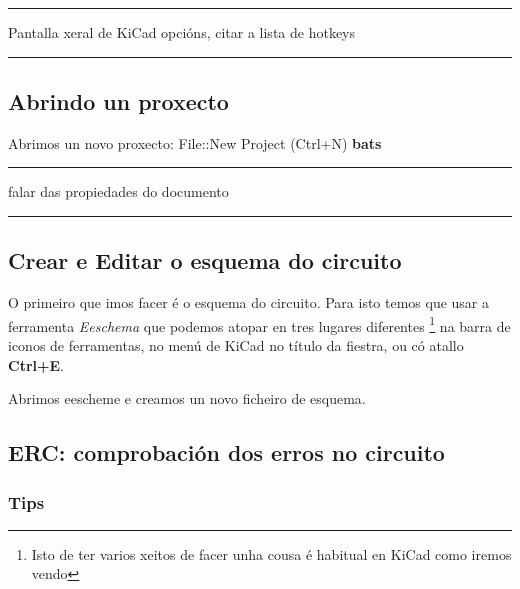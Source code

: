 \begin{center}\rule{0.5\linewidth}{\linethickness}\end{center}

Pantalla xeral de KiCad opcións, citar a lista de hotkeys

\begin{center}\rule{0.5\linewidth}{\linethickness}\end{center}

\subsection{Abrindo un proxecto}\label{abrindo-un-proxecto}

Abrimos un novo proxecto: File::New Project (Ctrl+N) \textbf{bats}

\begin{center}\rule{0.5\linewidth}{\linethickness}\end{center}

falar das propiedades do documento

\begin{center}\rule{0.5\linewidth}{\linethickness}\end{center}

\subsection{Crear e Editar o esquema do
circuito}\label{crear-e-editar-o-esquema-do-circuito}

O primeiro que imos facer é o esquema do circuito. Para isto temos que
usar a ferramenta \emph{Eeschema} que podemos atopar en tres lugares
diferentes \footnote{Isto de ter varios xeitos de facer unha cousa é
  habitual en KiCad como iremos vendo} na barra de iconos de
ferramentas, no menú de KiCad no título da fiestra, ou có atallo
\textbf{Ctrl+E}.

Abrimos eescheme e creamos un novo ficheiro de esquema.

\subsection{ERC: comprobación dos erros no
circuito}\label{erc-comprobaciuxf3n-dos-erros-no-circuito}

\subsubsection{Tips}\label{tips}

